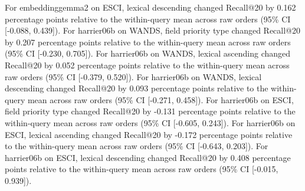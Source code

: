 For embeddinggemma2 on ESCI, lexical descending changed Recall@20 by 0.162 percentage points relative to the within-query mean across raw orders (95\% CI [-0.088, 0.439]).
For harrier06b on WANDS, field priority type changed Recall@20 by 0.207 percentage points relative to the within-query mean across raw orders (95\% CI [-0.230, 0.705]).
For harrier06b on WANDS, lexical ascending changed Recall@20 by 0.052 percentage points relative to the within-query mean across raw orders (95\% CI [-0.379, 0.520]).
For harrier06b on WANDS, lexical descending changed Recall@20 by 0.093 percentage points relative to the within-query mean across raw orders (95\% CI [-0.271, 0.458]).
For harrier06b on ESCI, field priority type changed Recall@20 by -0.131 percentage points relative to the within-query mean across raw orders (95\% CI [-0.605, 0.243]).
For harrier06b on ESCI, lexical ascending changed Recall@20 by -0.172 percentage points relative to the within-query mean across raw orders (95\% CI [-0.643, 0.203]).
For harrier06b on ESCI, lexical descending changed Recall@20 by 0.408 percentage points relative to the within-query mean across raw orders (95\% CI [-0.015, 0.939]).
